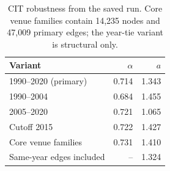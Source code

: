 \begin{table}[t]
\centering\small
\begin{tabular*}{\columnwidth}{@{\extracolsep{\fill}}lrr@{}}
\toprule
Variant & $\alpha$ & $a$\\
\midrule
1990--2020 (primary) & 0.714 & 1.343\\
1990--2004 & 0.684 & 1.455\\
2005--2020 & 0.721 & 1.065\\
Cutoff 2015 & 0.722 & 1.427\\
Core venue families & 0.731 & 1.410\\
Same-year edges included & -- & 1.324\\
\bottomrule
\end{tabular*}
\caption{CIT robustness from the saved run. Core venue families contain 14,235
nodes and 47,009 primary edges; the year-tie variant is structural only.}
\label{tab:b-robustness}
\end{table}
